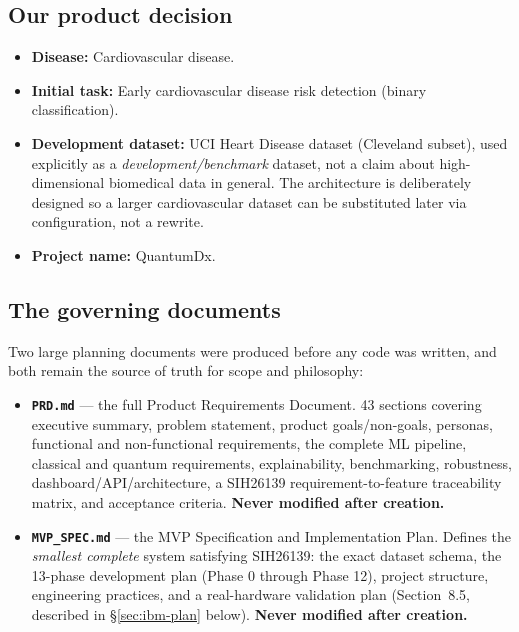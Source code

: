 \documentclass[11pt,a4paper]{article}
\newcommand{\code}[1]{\texttt{\small #1}}
\begin{document}
\subsection{Our product decision}

\begin{itemize}[leftmargin=1.4em]
  \item \textbf{Disease:} Cardiovascular disease.
  \item \textbf{Initial task:} Early cardiovascular disease risk detection (binary classification).
  \item \textbf{Development dataset:} UCI Heart Disease dataset (Cleveland subset), used explicitly as a \emph{development/benchmark} dataset, not a claim about high-dimensional biomedical data in general. The architecture is deliberately designed so a larger cardiovascular dataset can be substituted later via configuration, not a rewrite.
  \item \textbf{Project name:} QuantumDx.
\end{itemize}

\subsection{The governing documents}

Two large planning documents were produced before any code was written, and both remain the source of truth for scope and philosophy:

\begin{itemize}[leftmargin=1.4em]
  \item \textbf{\code{PRD.md}} --- the full Product Requirements Document. 43 sections covering executive summary, problem statement, product goals/non-goals, personas, functional and non-functional requirements, the complete ML pipeline, classical and quantum requirements, explainability, benchmarking, robustness, dashboard/API/architecture, a SIH26139 requirement-to-feature traceability matrix, and acceptance criteria. \textbf{Never modified after creation.}
  \item \textbf{\code{MVP\_SPEC.md}} --- the MVP Specification and Implementation Plan. Defines the \emph{smallest complete} system satisfying SIH26139: the exact dataset schema, the 13-phase development plan (Phase 0 through Phase 12), project structure, engineering practices, and a real-hardware validation plan (Section~8.5, described in \S\ref{sec:ibm-plan} below). \textbf{Never modified after creation.}
\end{itemize}
\end{document}
